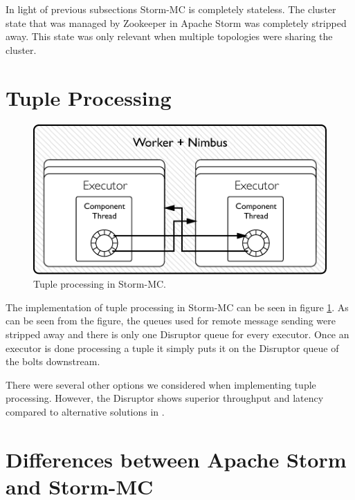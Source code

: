 In light of previous subsections Storm-MC is completely stateless. The cluster state that was managed by Zookeeper in Apache Storm was completely stripped away. This state was only relevant when multiple topologies were sharing the cluster.

\section{Tuple Processing}
\label{sec:mc_tuple_processing}


\begin{figure}[!htb]
	\centering
	\includegraphics[scale=0.7]{pdf/worker_inside_mc.pdf}
	\caption{Tuple processing in Storm-MC.}
	\label{fig:worker_inside_mc}
\end{figure}

The implementation of tuple processing in Storm-MC can be seen in figure \ref{fig:worker_inside_mc}. As can be seen from the figure, the queues used for remote message sending were stripped away and there is only one Disruptor queue for every executor. Once an executor is done processing a tuple it simply puts it on the Disruptor queue of the bolts downstream.

There were several other options we considered when implementing tuple processing. However, the Disruptor shows superior throughput and latency compared to alternative solutions in \cite{something}.


\section{Differences between Apache Storm and Storm-MC}
\label{differences}

